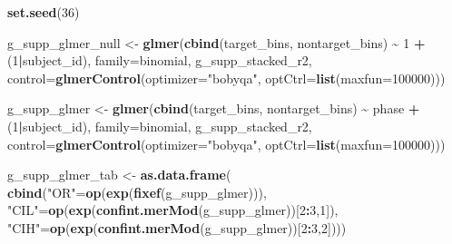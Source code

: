 \documentclass[
  doc,floatsintext]{apa6}
\newenvironment{Shaded}{\begin{snugshade}}{\end{snugshade}}
\newcommand{\AttributeTok}[1]{\textcolor[rgb]{0.13,0.29,0.53}{#1}}
\newcommand{\DecValTok}[1]{\textcolor[rgb]{0.00,0.00,0.81}{#1}}
\newcommand{\FunctionTok}[1]{\textcolor[rgb]{0.13,0.29,0.53}{\textbf{#1}}}
\newcommand{\NormalTok}[1]{#1}
\newcommand{\OtherTok}[1]{\textcolor[rgb]{0.56,0.35,0.01}{#1}}
\newcommand{\SpecialCharTok}[1]{\textcolor[rgb]{0.81,0.36,0.00}{\textbf{#1}}}
\newcommand{\StringTok}[1]{\textcolor[rgb]{0.31,0.60,0.02}{#1}}
\begin{document}
\begin{Shaded}
\begin{Highlighting}[]
\FunctionTok{set.seed}\NormalTok{(}\DecValTok{36}\NormalTok{) }

\NormalTok{g\_supp\_glmer\_null }\OtherTok{\textless{}{-}} \FunctionTok{glmer}\NormalTok{(}\FunctionTok{cbind}\NormalTok{(target\_bins, nontarget\_bins) }\SpecialCharTok{\textasciitilde{}}
                         \DecValTok{1} \SpecialCharTok{+}\NormalTok{ (}\DecValTok{1}\SpecialCharTok{|}\NormalTok{subject\_id),}
                        \AttributeTok{family=}\NormalTok{binomial, g\_supp\_stacked\_r2,}
                        \AttributeTok{control=}\FunctionTok{glmerControl}\NormalTok{(}\AttributeTok{optimizer=}\StringTok{"bobyqa"}\NormalTok{, }
                        \AttributeTok{optCtrl=}\FunctionTok{list}\NormalTok{(}\AttributeTok{maxfun=}\DecValTok{100000}\NormalTok{)))}

\NormalTok{g\_supp\_glmer }\OtherTok{\textless{}{-}} \FunctionTok{glmer}\NormalTok{(}\FunctionTok{cbind}\NormalTok{(target\_bins, nontarget\_bins) }\SpecialCharTok{\textasciitilde{}}
\NormalTok{                         phase }\SpecialCharTok{+}\NormalTok{ (}\DecValTok{1}\SpecialCharTok{|}\NormalTok{subject\_id),}
                        \AttributeTok{family=}\NormalTok{binomial, g\_supp\_stacked\_r2,}
                        \AttributeTok{control=}\FunctionTok{glmerControl}\NormalTok{(}\AttributeTok{optimizer=}\StringTok{"bobyqa"}\NormalTok{, }
                        \AttributeTok{optCtrl=}\FunctionTok{list}\NormalTok{(}\AttributeTok{maxfun=}\DecValTok{100000}\NormalTok{)))}

\NormalTok{g\_supp\_glmer\_tab }\OtherTok{\textless{}{-}} \FunctionTok{as.data.frame}\NormalTok{(}
  \FunctionTok{cbind}\NormalTok{(}\StringTok{"OR"}\OtherTok{=}\FunctionTok{op}\NormalTok{(}\FunctionTok{exp}\NormalTok{(}\FunctionTok{fixef}\NormalTok{(g\_supp\_glmer))),}
        \StringTok{"CIL"}\OtherTok{=}\FunctionTok{op}\NormalTok{(}\FunctionTok{exp}\NormalTok{(}\FunctionTok{confint.merMod}\NormalTok{(g\_supp\_glmer))[}\DecValTok{2}\SpecialCharTok{:}\DecValTok{3}\NormalTok{,}\DecValTok{1}\NormalTok{]),}
        \StringTok{"CIH"}\OtherTok{=}\FunctionTok{op}\NormalTok{(}\FunctionTok{exp}\NormalTok{(}\FunctionTok{confint.merMod}\NormalTok{(g\_supp\_glmer))[}\DecValTok{2}\SpecialCharTok{:}\DecValTok{3}\NormalTok{,}\DecValTok{2}\NormalTok{])))}


\end{Highlighting}
\end{Shaded}
\end{document}
